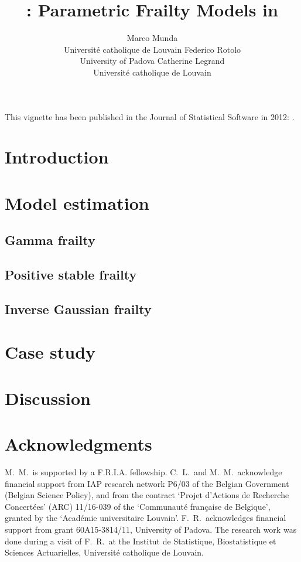 \documentclass[nojss]{jss}
\author{Marco Munda\\Universit\'e catholique de Louvain \And 
        Federico Rotolo\\University of Padova \And
        Catherine Legrand\\Universit\'e catholique de Louvain}
\title{\pkg{parfm}: Parametric Frailty Models in \proglang{R}}
\begin{document}
This vignette has been published in the Journal of Statistical Software in 2012:
\cite{MundaEtal12}.

\section{Introduction}
  \label{sec:intro}
  

\section{Model estimation}
  \label{sec:model}
    
  \clearpage
  \subsection{Gamma frailty}
    \label{sec:model:gamma}
    
  \subsection{Positive stable frailty}
    \label{sec:model:PS}
    
  \subsection{Inverse Gaussian frailty}
    \label{sec:model:IG}
    

\section{Case study}
  \label{sec:rexample}
  
  
\section{Discussion}
  \label{sec:concl}
  


\section*{Acknowledgments}
M.~M.\ is supported by a F.R.I.A. fellowship.
C.~L.\ and M.~M.\ acknowledge financial support from IAP research network P6/03 of the Belgian Government (Belgian Science Policy), and from the contract `Projet d'Actions de Recherche Concert\'ees' (ARC) 11/16-039 of the `Communaut\'e fran\c{c}aise de Belgique', granted by the `Acad\'emie universitaire Louvain'. 
F.~R.\ acknowledges financial support from grant 60A15-3814/11, University of Padova.
The research work was done during a visit of F.~R.\ at the Institut de Statistique, Biostatistique et Sciences Actuarielles, Universit\'e catholique de Louvain.
\end{document}
